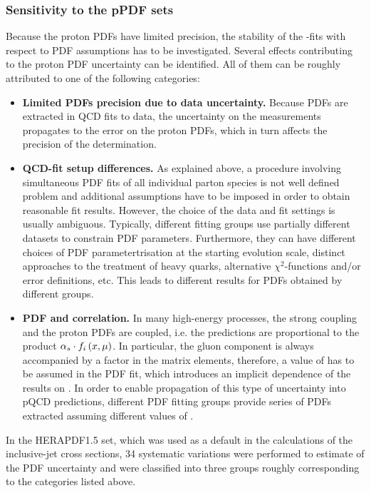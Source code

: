 \subsubsection{Sensitivity to the pPDF sets}
\label{subsec:aspdfassump}
Because the proton PDFs have limited precision, the stability of the \asz-fits with respect to PDF assumptions has to be investigated. Several effects contributing to the proton PDF uncertainty can be identified. All of them can be roughly attributed to one of the following categories:
\begin{itemize}
 \item \textbf{Limited PDFs precision due to data uncertainty.} Because PDFs are extracted in QCD fits to data, the uncertainty on the measurements propagates to the error on the proton PDFs, which in turn affects the precision of the \asz determination.
 \item \textbf{QCD-fit setup differences.} As explained above, a procedure involving simultaneous PDF fits of all individual parton species is not well defined problem and additional assumptions have to be imposed in order to obtain reasonable fit results. However, the choice of the data and fit settings is usually ambiguous. Typically, different fitting groups use partially different datasets to constrain PDF parameters. Furthermore, they can have different choices of PDF parametertrisation at the starting evolution scale, distinct approaches to the treatment of heavy quarks, alternative $\chi^2$-functions and/or error definitions, etc. This leads to different results for PDFs obtained by different groups.
 \item \textbf{PDF and \asz correlation.} In many high-energy processes, the strong coupling and the proton PDFs are coupled, i.e. the predictions are proportional to the product $\mbox{$\alpha_{s}$}\cdot f_i\left(x,\mu\right)$. In particular, the gluon component is always accompanied by a factor \as in the matrix elements, therefore, a value of \asz has to be assumed in the PDF fit, which introduces an implicit dependence of the results on \asz. In order to enable propagation of this type of uncertainty into pQCD predictions, different PDF fitting groups provide series of PDFs extracted assuming different values of \asz.
\end{itemize}

In the HERAPDF1.5 set, which was used as a default in the calculations of the inclusive-jet cross sections, 34 systematic variations were performed to estimate of the PDF uncertainty and were classified into three groups roughly corresponding to the categories listed above. 

